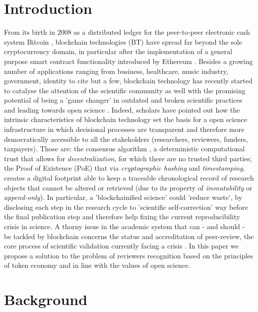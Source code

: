 \documentclass[runningheads]{llncs}
\begin{document}
\section{Introduction}
From its birth in 2008 as a distributed ledger for the peer-to-peer electronic cash system Bitcoin \cite{BitcoinSatoshi}, blockchain technologies (BT) have spread far beyond the sole cryptocurrency domain, in particular after the implementation of a general purpose smart contract functionality introduced by Ethereum \cite{Ethereum}.
Besides a growing number of applications ranging from business, healthcare, music industry, government, identity to cite but a few, blockchain technology has recently started to catalyse the attention of the scientific community as well \cite{Bitcoin-Nature-focus,vanRossum2017-DigSci} with the promising potential of being a 'game changer' in outdated and broken scientific practices and leading towards open science \cite{AES}. Indeed, scholars have pointed out how the intrinsic characteristics of blockchain technology set the basis for a open science infrastructure \cite{ReviewBlockchain2019} in which decisional processes are transparent and therefore more democratically accessible to all the stakeholders (researchers, reviewers, funders, taxpayers). Those are: the consensus algorithm \cite{ConsAlg}, a deterministic computational trust that allows for \emph{decentralization}, for which there are no trusted third parties; the Proof of Existence (PoE) that via \emph{cryptographic hashing} and \emph{timestamping}, creates a digital footprint able to keep a traceable chronological record of research objects that cannot be altered or retrieved (due to its property of \emph{immutability} or \emph{append-only})\cite{ReviewBlockchain2019}. In particular, a 'blockchainified science'\cite{BlockchainforScience} could 'reduce waste'\cite{ReducingWaste-Lancet}, by disclosing each step in the research cycle to 'scientific self-correction' way before the final publication step and therefore help fixing the current reproducibility crisis in science.
\newline A thorny issue in the academic system that can - and should - be tackled by blockchain concerns the status and accreditation of peer-review, the core process of scientific validation currently facing a crisis \cite{Gropp-PeerRevStress}.
In this paper we propose a solution to the problem of reviewers recognition based on the principles of token economy \cite{TokenEcon} and in line with the values of open science.

\section{Background}
\end{document}
